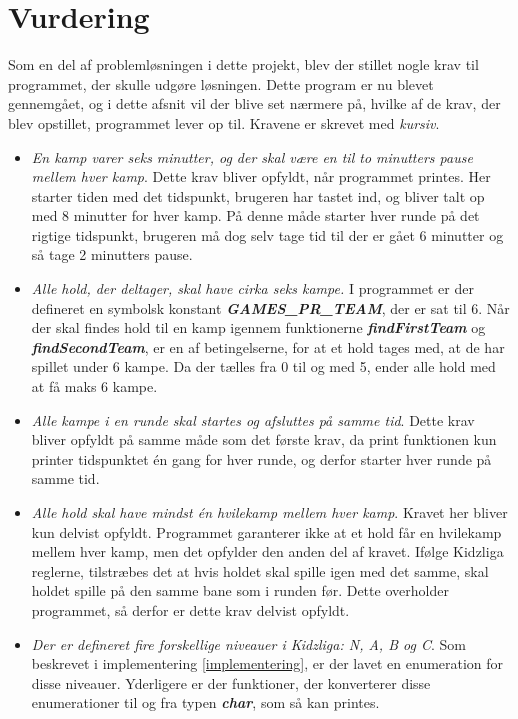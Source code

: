 \chapter{Vurdering}\label{ch:vurdering}
Som en del af problemløsningen i dette projekt, blev der stillet nogle krav til programmet, der skulle udgøre løsningen. Dette program er nu blevet gennemgået, og i dette afsnit vil der blive set nærmere på, hvilke af de krav, der blev opstillet, programmet lever op til. Kravene er skrevet med \textit{kursiv}.
\begin{itemize}
    \item \textit{En kamp varer seks minutter, og der skal være en til to minutters pause mellem hver kamp}. Dette krav bliver opfyldt, når programmet printes. Her starter tiden med det tidspunkt, brugeren har tastet ind, og bliver talt op med 8 minutter for hver kamp. På denne måde starter hver runde på det rigtige tidspunkt, brugeren må dog selv tage tid til der er gået 6 minutter og så tage 2 minutters pause.
    \item \textit{Alle hold, der deltager, skal have cirka seks kampe.} I programmet er der defineret en symbolsk konstant \textbf{\textit{GAMES\_PR\_TEAM}}, der er sat til 6. Når der skal findes hold til en kamp igennem funktionerne \textbf{\textit{findFirstTeam}} og \textbf{\textit{findSecondTeam}}, er en af betingelserne, for at et hold tages med, at de har spillet under 6 kampe. Da der tælles fra 0 til og med 5, ender alle hold med at få maks 6 kampe.
    \item \textit{Alle kampe i en runde skal startes og afsluttes på samme tid}. Dette krav bliver opfyldt på samme måde som det første krav, da print funktionen kun printer tidspunktet én gang for hver runde, og derfor starter hver runde på samme tid.
    \item \textit{Alle hold skal have mindst én hvilekamp mellem hver kamp}. Kravet her bliver kun delvist opfyldt. Programmet garanterer ikke at et hold får en hvilekamp mellem hver kamp, men det opfylder den anden del af kravet. Ifølge Kidzliga reglerne, tilstræbes det at hvis holdet skal spille igen med det samme, skal holdet spille på den samme bane som i runden før. Dette overholder programmet, så derfor er dette krav delvist opfyldt.
    \item \textit{Der er defineret fire forskellige niveauer i Kidzliga: N, A, B og C}. Som beskrevet i implementering \ref{implementering}, er der lavet en enumeration for disse niveauer. Yderligere er der funktioner, der konverterer disse enumerationer til og fra typen \textbf{\textit{char}}, som så kan printes.

\end{itemize}
